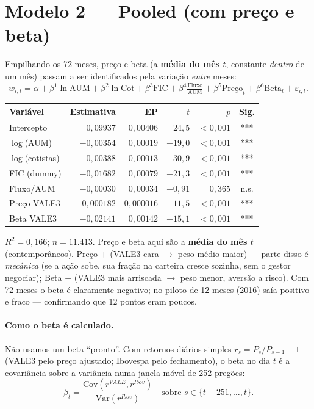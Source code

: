 \documentclass[11pt]{article}
\begin{document}
\section{Modelo 2 — Pooled (com preço e beta)}

Empilhando os 72 meses, preço e beta (a \textbf{média do mês $t$}, constante
\emph{dentro} de um mês) passam a ser identificados pela variação \emph{entre} meses:
\begin{equation}
w_{i,t} = \alpha + \beta^{1}\ln\text{AUM} + \beta^{2}\ln\text{Cot} + \beta^{3}\text{FIC}
        + \beta^{4}\tfrac{\text{Fluxo}}{\text{AUM}} + \beta^{5}\text{Preço}_t
        + \beta^{6}\text{Beta}_t + \varepsilon_{i,t}.
\label{eq:pool}
\end{equation}

\begin{table}[h]\centering
\begin{tabular}{@{}lrrrrc@{}}
\toprule
\textbf{Variável} & \textbf{Estimativa} & \textbf{EP} & \textbf{$t$} & \textbf{$p$} & \textbf{Sig.} \\
\midrule
Intercepto       & $0{,}09937$  & $0{,}00406$ & $24{,}5$   & $<0{,}001$ & *** \\
$\log$(AUM)      & $-0{,}00354$ & $0{,}00019$ & $-19{,}0$  & $<0{,}001$ & *** \\
$\log$(cotistas) & $0{,}00388$  & $0{,}00013$ & $30{,}9$   & $<0{,}001$ & *** \\
FIC (dummy)      & $-0{,}01682$ & $0{,}00079$ & $-21{,}3$  & $<0{,}001$ & *** \\
Fluxo/AUM        & $-0{,}00030$ & $0{,}00034$ & $-0{,}91$  & $0{,}365$  & n.s. \\
Preço VALE3      & $0{,}000182$ & $0{,}000016$& $11{,}5$   & $<0{,}001$ & *** \\
Beta VALE3       & $-0{,}02141$ & $0{,}00142$ & $-15{,}1$  & $<0{,}001$ & *** \\
\bottomrule
\end{tabular}
\end{table}
\noindent\footnotesize $R^2=0{,}166$; $n=11.413$. Preço e beta aqui são a \textbf{média
do mês $t$} (contemporâneos). Preço $+$ (VALE3 cara $\to$ peso médio maior) --- parte
disso é \emph{mecânica} (se a ação sobe, sua fração na carteira cresce sozinha, sem o
gestor negociar); Beta $-$ (VALE3 mais arriscada $\to$ peso menor, aversão a risco).
Com 72 meses o beta é claramente negativo; no piloto de 12 meses (2016) saía positivo
e fraco — confirmando que 12 pontos eram poucos. \normalsize

\paragraph{Como o beta é calculado.} Não usamos um beta ``pronto''. Com retornos
diários simples $r_s = P_s/P_{s-1}-1$ (VALE3 pelo preço ajustado; Ibovespa pelo
fechamento), o beta no dia $t$ é a covariância sobre a variância numa janela móvel de
252 pregões:
\begin{equation}
\beta_t = \frac{\mathrm{Cov}\!\left(r^{VALE}, r^{Ibov}\right)}{\mathrm{Var}\!\left(r^{Ibov}\right)}
\quad \text{sobre } s \in \{t-251,\dots,t\}.
\label{eq:beta}
\end{equation}
\end{document}
